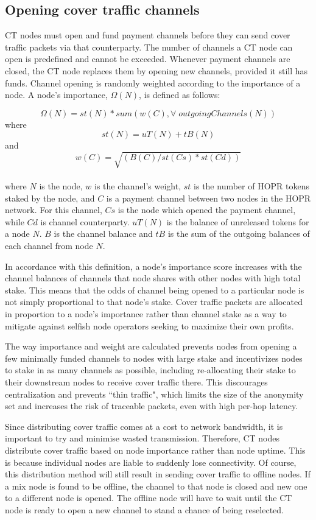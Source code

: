 \subsection{Opening cover traffic channels}
\label{sec:ct:channelopen}

CT nodes must open and fund payment channels before they can send cover traffic packets via that counterparty. The number of channels a CT node can open is predefined and cannot be exceeded. Whenever payment channels are closed, the CT node replaces them by opening new channels, provided it still has funds. Channel opening is randomly weighted according to the importance of a node. A node's importance, $\Omega(N)$, is defined as follows:

$$\Omega(N) = st(N) * sum(w(C), \forall \; outgoingChannels(N))$$
where
$$st(N) = uT(N) + tB(N)$$
and
$$w(C) = \sqrt{(B(C) / st(Cs) * st(Cd))}$$
\\
where $N$ is the node, $w$ is the channel's weight, $st$ is the number of HOPR tokens staked by the node, and $C$ is a payment channel between two nodes in the HOPR network. For this channel, $Cs$ is the node which opened the payment channel, while $Cd$ is channel counterparty. $uT(N)$ is the balance of unreleased tokens for a node $N$. $B$ is the channel balance and $tB$ is the sum of the outgoing balances of each channel from node $N$.

In accordance with this definition, a node's importance score increases with the channel balances of channels that node shares with other nodes with high total stake. This means that the odds of channel being opened to a particular node is not simply proportional to that node’s stake. Cover traffic packets are allocated in proportion to a node's importance rather than channel stake as a way to mitigate against selfish node operators seeking to maximize their own profits.

The way importance and weight are calculated prevents nodes from opening a few minimally funded channels to nodes with large stake and incentivizes nodes to stake in as many channels as possible,  including re-allocating their stake to their downstream nodes to receive cover traffic there. This discourages centralization and prevents ``thin traffic", which limits the size of the anonymity set and increases the risk of traceable packets, even with high per-hop latency.

Since distributing cover traffic comes at a cost to network bandwidth, it is important to try and minimise wasted transmission. Therefore, CT nodes distribute cover traffic based on node importance rather than node uptime. This is because individual nodes are liable to suddenly lose connectivity. Of course, this distribution method will still result in sending cover traffic to offline nodes. If a mix node is found to be offline, the channel to that node is closed and new one to a different node is opened. The offline node will have to wait until the CT node is ready to open a new channel to stand a chance of being reselected.